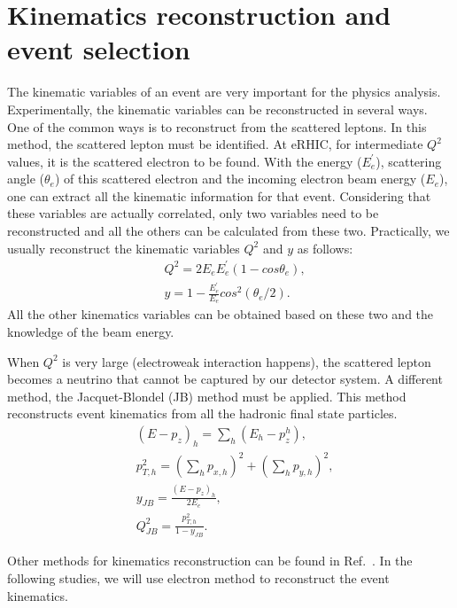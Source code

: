 \section{Kinematics reconstruction and event selection}
The kinematic variables of an event are very important for the physics analysis.
Experimentally, the kinematic variables can be reconstructed in several ways.
One of the common ways is to reconstruct from the scattered leptons. In this
method, the scattered lepton must be identified. At eRHIC, for intermediate
$Q^{2}$ values, it is the scattered electron to be found. With the energy
($E^{'}_{e}$), scattering angle ($\theta_{e}$) of this scattered electron and
the incoming electron beam energy ($E_{e}$), one can extract all the kinematic
information for that event. Considering that these variables are actually
correlated, only two variables need to be reconstructed and all the others can
be calculated from these two. Practically, we usually reconstruct the kinematic
variables $Q^{2}$ and $y$ as follows:
\begin{align}
& Q^{2}=2E_{e}E^{'}_{e}(1-cos\theta_{e}), \nonumber \\ 
& y=1-\frac{E^{'}_{e}}{E_{e}}cos^{2}(\theta_{e}/2).
\label{eqn:electr_method}
\end{align}
All the other kinematics variables can be obtained based on these two and
the knowledge of the beam energy. 

When $Q^{2}$ is very large  (electroweak interaction happens), the scattered
lepton becomes a neutrino that cannot be captured by our detector system. A
different method, the Jacquet-Blondel (JB) method must be applied. This method
reconstructs event kinematics from all the hadronic final state particles.
\begin{align}
& (E-p_{z})_{h} = \sum_{h}(E_{h}-p_{z}^{h}), \nonumber \\ 
& p_{T,h}^{2} = (\sum_{h}p_{x,h})^{2}+(\sum_{h}p_{y,h})^{2}, \nonumber \\ 
& y_{JB}=\frac{(E-p_{z})_{h}}{2E_{e}}, \nonumber \\ 
& Q_{JB}^{2}=\frac{p_{T,h}^{2}}{1-y_{JB}}.
\end{align}

Other methods for kinematics reconstruction can be found in
Ref.~\cite{Blumlein:2012bf}. In the following studies, we will use electron
method to reconstruct the event kinematics. 


